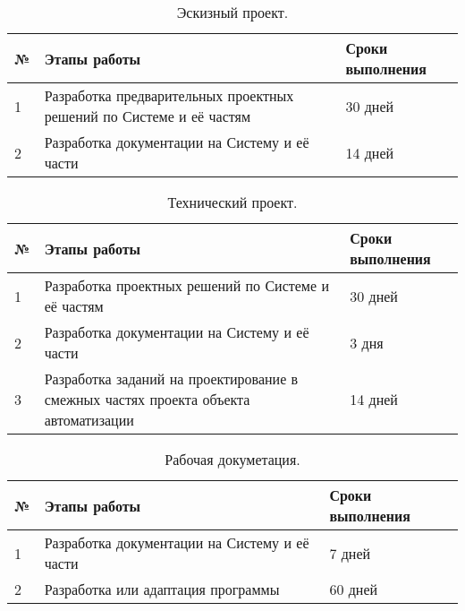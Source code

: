 \begin{table}[H]
\caption{\label{tab:Task4}
Эскизный проект.}
\begin{center}
\begin{tabular}{|p{1cm}||p{9cm}|p{4cm}|}
\hline
№ & Этапы работы & Сроки выполнения \\
\hline
\hline
1 & Разработка предварительных проектных решений по Системе
и её частям & 30 дней \\
\hline
2 & Разработка документации на Систему и её части & 14 дней \\
\hline
\end{tabular}
\end{center}
\end{table}
\begin{table}[H]
\caption{\label{tab:Task5}
Технический проект.}
\begin{center}
\begin{tabular}{|p{1cm}||p{9cm}|p{4cm}|}
\hline
№ & Этапы работы & Сроки выполнения \\
\hline
\hline
1 & Разработка проектных решений по Системе
и её частям & 30 дней \\
\hline
2 & Разработка документации на Систему и её части & 3 дня \\
\hline
3 & Разработка заданий на проектирование в смежных
частях проекта объекта автоматизации & 14 дней \\
\hline
\end{tabular}
\end{center}
\end{table}
\begin{table}[H]
\caption{\label{tab:Task6}
Рабочая докуметация.}
\begin{center}
\begin{tabular}{|p{1cm}||p{9cm}|p{4cm}|}
\hline
№ & Этапы работы & Сроки выполнения \\
\hline
\hline
1 & Разработка документации на Систему и её части & 7 дней \\
\hline
2 & Разработка или адаптация программы & 60 дней \\
\hline
\end{tabular}
\end{center}
\end{table}
